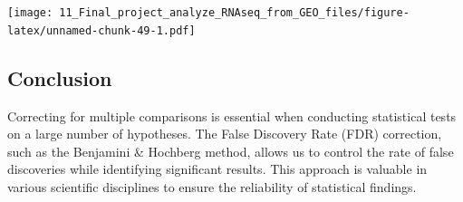 \documentclass[
]{book}
\begin{document}
\texttt{[image: 11\_Final\_project\_analyze\_RNAseq\_from\_GEO\_files/figure-latex/unnamed-chunk-49-1.pdf]}

\hypertarget{conclusion-33}{%
\subsection{Conclusion}\label{conclusion-33}}

Correcting for multiple comparisons is essential when conducting statistical tests on a large number of hypotheses. The False Discovery Rate (FDR) correction, such as the Benjamini \& Hochberg method, allows us to control the rate of false discoveries while identifying significant results. This approach is valuable in various scientific disciplines to ensure the reliability of statistical findings.

  
\end{document}
